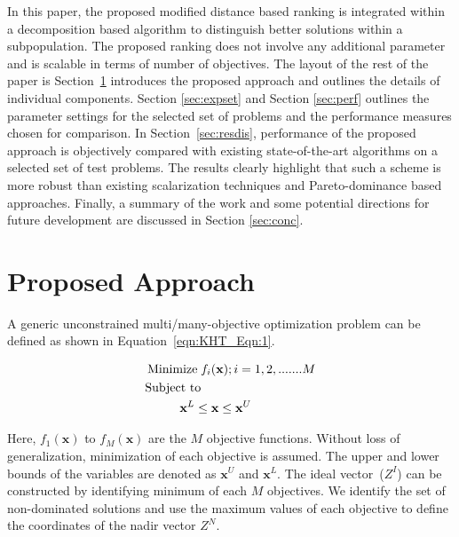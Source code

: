 \documentclass{sig-alternate}
\begin{document}
In this paper, the proposed modified distance based ranking is integrated within a decomposition based algorithm to distinguish better solutions within a subpopulation. The proposed ranking does not involve any additional parameter and is scalable in terms of number of objectives. The layout of the rest of the paper is  Section~\ref{sec:proapp} introduces the proposed approach and outlines the details of individual components. Section \ref{sec:expset} and Section \ref{sec:perf} outlines the parameter settings for the selected set of problems and the performance measures chosen for comparison. In Section~\ref{sec:resdis}, performance of the proposed approach is objectively compared with existing state-of-the-art algorithms on a selected set of test problems. The results clearly highlight that such a scheme is more robust than existing scalarization techniques and Pareto-dominance based approaches. Finally, a summary of the work and some potential directions for future development are discussed in Section \ref{sec:conc}.


\section{Proposed Approach}
\label{sec:proapp}

\label{sec:KHT_sec:2}
A generic unconstrained multi/many-objective optimization problem can be defined as shown in Equation~\ref{eqn:KHT_Eqn:1}.

\begin{equation}
\begin{aligned}
\operatorname{Minimize}\; & f_i(\textbf{x}); i=1,2,.......M \\
\text{Subject to} & \\ 
& \hspace{-0.6cm}\textbf{x}^{L}\le\textbf{x}\le\textbf{x}^{U}\\ 
\label{eqn:KHT_Eqn:1}
\end{aligned}
\end{equation}

\noindent Here, $f_1(\textbf{x})$  to $f_M(\textbf{x})$ are the $M$ objective functions. Without loss of generalization, minimization of each objective is assumed. The upper and lower bounds of the variables are denoted as $\textbf{x}^{U}$ and $\textbf{x}^{L}$. The ideal vector~($Z^I$) can be constructed by identifying minimum of each $M$ objectives. We identify the set of non-dominated solutions and use the maximum values of each objective to define the coordinates of the nadir vector $Z^N$. 
\end{document}

